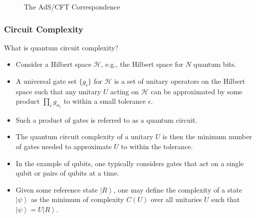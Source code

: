 \documentclass[10pt,aspectratio=169]{beamer}
\newcommand{\ket}[1]{\left| #1 \right>}
\begin{document}
\begin{frame}
\begin{minipage}[t]{0.48\linewidth}
\begin{figure}
\begin{center}
    \end{center}
    \caption{The AdS/CFT Correspondence}
    \label{fig:WDW}
\end{figure}

\end{minipage}

\end{frame}

\begin{frame}
\frametitle{Circuit Complexity}

What is quantum circuit complexity?

\begin{itemize}

\item Consider a Hilbert space $\mathcal{H}$, e.g., the Hilbert space for $N$ quantum bits.

\item A universal gate set $\{g_i\}$ for $\mathcal{H}$ is a set of unitary operators on the Hilbert space such that any unitary $U$ acting on $\mathcal{H}$ can be approximated by some product $\displaystyle\prod_{i} g_{\alpha_i}$ to within a small tolerance $\epsilon$. 

\item Such a product of gates is referred to as a quantum circuit.

\item The quantum circuit complexity of a unitary $U$ is then the minimum number of gates needed to approximate $U$ to within the tolerance.

\item In the example of qubits, one typically considers gates that act on a single qubit or pairs of qubits at a time.

\item Given some reference state $\ket{R}$, one may define the complexity of a state $\ket{\psi}$ as the minimum of complexity $C(U)$ over all unitaries $U$ such that $\ket{\psi} = U\ket{R}$.

\end{itemize}

\end{frame}
\end{document}
